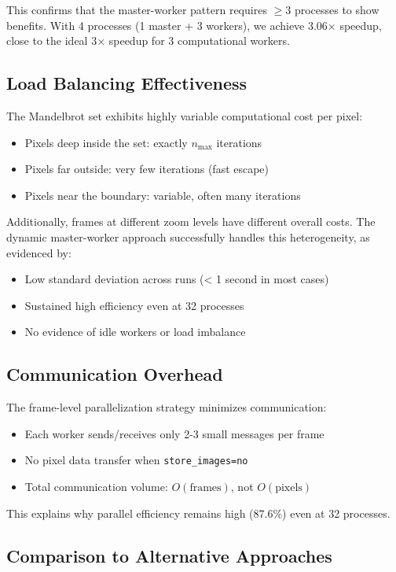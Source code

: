 \documentclass[11pt,a4paper]{article}
\begin{document}
	This confirms that the master-worker pattern requires $\geq 3$ processes to show benefits. With 4 processes (1 master + 3 workers), we achieve 3.06× speedup, close to the ideal 3× speedup for 3 computational workers.
	
	\subsection{Load Balancing Effectiveness}
	
	The Mandelbrot set exhibits highly variable computational cost per pixel:
	\begin{itemize}
		\item Pixels deep inside the set: exactly $n_{\text{max}}$ iterations
		\item Pixels far outside: very few iterations (fast escape)
		\item Pixels near the boundary: variable, often many iterations
	\end{itemize}
	
	Additionally, frames at different zoom levels have different overall costs. The dynamic master-worker approach successfully handles this heterogeneity, as evidenced by:
	\begin{itemize}
		\item Low standard deviation across runs (< 1 second in most cases)
		\item Sustained high efficiency even at 32 processes
		\item No evidence of idle workers or load imbalance
	\end{itemize}
	
	\subsection{Communication Overhead}
	
	The frame-level parallelization strategy minimizes communication:
	\begin{itemize}
		\item Each worker sends/receives only 2-3 small messages per frame
		\item No pixel data transfer when \texttt{store\_images=no}
		\item Total communication volume: $O(\text{frames})$, not $O(\text{pixels})$
	\end{itemize}
	
	This explains why parallel efficiency remains high (87.6\%) even at 32 processes.
	
	\subsection{Comparison to Alternative Approaches}
	
\end{document}

